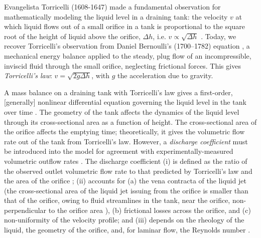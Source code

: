 \documentclass[openacc]{rsproca_new}%
\begin{document}

Evangelista Torricelli (1608-1647) made a fundamental observation for mathematically modeling the liquid level in a draining tank: the velocity $v$ at which liquid flows out of a small orifice in a tank is proportional to the square root of the height of liquid above the orifice, $\Delta h$, i.e. $v\propto \sqrt{\Delta h}$ \cite{mills1982newton}.
Today, we recover Torricelli's observation from Daniel Bernoulli's (1700–1782) equation \cite{welty2020fundamentals}, a mechanical energy balance applied to the steady, plug flow of an incompressible, inviscid fluid through the small orifice, neglecting frictional forces. This gives \emph{Torricelli's law}: $v=\sqrt{2 g \Delta h}$, with $g$ the acceleration due to gravity. \cite{d2021torricelli,teoman2022discharge}

A mass balance on a draining tank with Torricelli's law gives a first-order, [generally] nonlinear differential equation governing the liquid level in the tank over time \cite{groetsch1993inverse_tl,seborg2016process,debook}.
The geometry of the tank affects the dynamics of the liquid level through its cross-sectional area as a function of height.
The cross-sectional area of the orifice affects the emptying time; theoretically, it gives the volumetric flow rate out of the tank from Torricelli's law. 
However, a \emph{discharge coefficient} \cite{de2000pin,blasone2015discharge,wadhwa2021study,liu2008drainage} must be introduced into the model for agreement with experimentally-measured volumetric outflow rates \cite{farmer1992physical,driver1998torricelli,brady2009siphons,rother2024modelling,paldy1963apparatus,ivanov2014testing,williams2021vessel,pavesi2019investigating,planinvsivc2011holes,saleta2005experimental,lopac2015water,powell2012carrying}.
The discharge coefficient \cite{teoman2022discharge,hicks2014determining,blasone2015discharge,lienhard1984velocity,wadhwa2021study}
(i) is defined as the ratio of the observed outlet volumetric flow rate to that predicted by Torricelli's law and the area of the orifice \cite{hicks2014determining};
(ii) accounts for (a) the vena contracta of the liquid jet (the cross-sectional area of the liquid jet issuing from the orifice is smaller than that of the orifice, owing to fluid streamlines in the tank, near the orifice, non-perpendicular to the orifice area \cite{horsch2020simple}), (b) frictional losses across the orifice, and (c) non-uniformity of the velocity profile; and
(iii) depends on the rheology of the liquid, the geometry of the orifice, and, for laminar flow, the Reynolds number \cite{teoman2022discharge}. 
\end{document}
